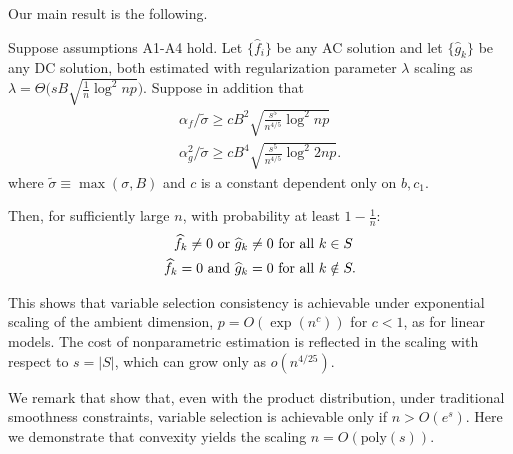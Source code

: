 Our main result is the following.
\begin{stheorem}
Suppose assumptions A1-A4 hold. Let $\{\hat{f}_i\}$ be any AC solution and
let $\{\hat{g}_k\}$ be any DC solution, both estimated with 
regularization parameter $\lambda$ scaling as
$\lambda = \Theta \Big( sB \sqrt{\frac{1}{n} \log^2 np} \Big)$. 
Suppose in addition that
\begin{gather}
\alpha_f/\tilde{\sigma} \geq c B^2 \sqrt{\frac{s^5}{n^{4/5}} \log^2
  np}\\
\alpha_g^2/\tilde{\sigma} \geq c B^4 \sqrt{\frac{s^5}{n^{4/5}}
  \log^2 2np}.
\end{gather} 
where $\tilde{\sigma} \equiv \max(\sigma, B)$ and $c$ is a constant dependent only on $b, c_1$.

Then, for sufficiently large $n$, with probability at least $1-\frac{1}{n}$:
\begin{align*}
\widehat{f}_k \neq 0 \textrm{ or } \widehat{g}_k \neq 0 &\textrm{ for all } k \in S\\
\widehat{f}_k = 0 \textrm{ and } \widehat{g}_k = 0 & \textrm{ for all } k \notin S.
\end{align*}


\end{stheorem}

This shows that variable selection consistency is achievable under
exponential scaling of the ambient dimension, $p = O(\exp(n^c))$
for $c<1$, as for linear models. The cost of nonparametric estimation is
reflected in the scaling with respect to $s=|S|$, which can grow only
as $o(n^{4/25})$.

We remark that \citet{dalalyan:12} show that, even with the product distribution,
 under traditional smoothness
constraints, variable selection is achievable only if $n > O(e^s)$. 
Here we demonstrate that convexity yields the scaling $n =
O(\textrm{poly}(s))$.


